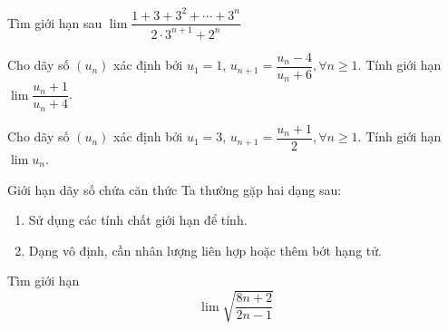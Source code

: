 \begin{bt}%
	Tìm giới hạn sau $\lim\dfrac{1+3+3^2+\cdots +3^n}{2\cdot 3^{n+1}+2^n}$
\end{bt}
\begin{bt}%
	Cho dãy số $(u_n)$ xác định bởi $u_1=1$, $u_{n+1}=\dfrac{u_n-4}{u_n+6}, \forall n\geq 1$. Tính giới hạn $\lim\dfrac{u_n+1}{u_n+4}$.
\end{bt}

\begin{bt}%
	Cho dãy số $(u_n)$ xác định bởi $u_1=3$, $u_{n+1}=\dfrac{u_n+1}{2}, \forall n\geq 1$. Tính giới hạn $\lim u_n$.
\end{bt}

\begin{dang}{Giới hạn dãy số chứa căn thức}
	Ta thường gặp hai dạng sau:
	\begin{enumerate}[Dạng 1.]
		\item Sử dụng các tính chất giới hạn để tính.
		\item Dạng vô định, cần nhân lượng liên hợp hoặc thêm bớt hạng tử.
	\end{enumerate}
\end{dang}
\begin{vd}%
	Tìm giới hạn $$\lim \sqrt{\dfrac{8n+2}{2n-1}} $$
\end{vd}

